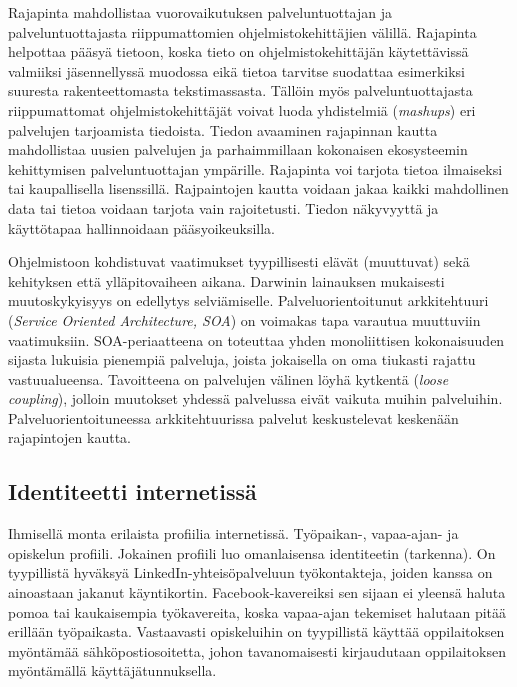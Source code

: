 \documentclass[finnish,gradu]{tktltiki}
\begin{document}
  Rajapinta mahdollistaa vuorovaikutuksen palveluntuottajan ja palveluntuottajasta riippumattomien ohjelmistokehittäjien välillä. Rajapinta helpottaa pääsyä tietoon, koska tieto on ohjelmistokehittäjän käytettävissä valmiiksi jäsennellyssä muodossa eikä tietoa tarvitse suodattaa esimerkiksi suuresta rakenteettomasta tekstimassasta. Tällöin myös palveluntuottajasta riippumattomat ohjelmistokehittäjät voivat luoda yhdistelmiä (\emph{mashups}) eri palvelujen tarjoamista tiedoista. Tiedon avaaminen rajapinnan kautta mahdollistaa uusien palvelujen ja parhaimmillaan kokonaisen ekosysteemin kehittymisen palveluntuottajan ympärille. Rajapinta voi tarjota tietoa ilmaiseksi tai kaupallisella lisenssillä. Rajpaintojen kautta voidaan jakaa kaikki mahdollinen data tai tietoa voidaan tarjota vain rajoitetusti. Tiedon näkyvyyttä ja käyttötapaa hallinnoidaan pääsyoikeuksilla.

  Ohjelmistoon kohdistuvat vaatimukset tyypillisesti elävät (muuttuvat) sekä kehityksen että ylläpitovaiheen aikana. Darwinin lainauksen mukaisesti muutoskykyisyys on edellytys selviämiselle. Palveluorientoitunut arkkitehtuuri (\emph{Service Oriented Architecture, SOA}) on voimakas tapa varautua muuttuviin vaatimuksiin. SOA-periaatteena on toteuttaa yhden monoliittisen kokonaisuuden sijasta lukuisia pienempiä palveluja, joista jokaisella on oma tiukasti rajattu vastuualueensa. Tavoitteena on palvelujen välinen löyhä kytkentä (\emph{loose coupling}), jolloin muutokset yhdessä palvelussa eivät vaikuta muihin palveluihin. Palveluorientoituneessa arkkitehtuurissa palvelut keskustelevat keskenään rajapintojen kautta.


  \subsection{Identiteetti internetissä} %
  \label{sub:identiteetti_internetissä}

  Ihmisellä monta erilaista profiilia internetissä. Työpaikan-, vapaa-ajan- ja opiskelun profiili. Jokainen profiili luo omanlaisensa identiteetin (tarkenna). On tyypillistä hyväksyä LinkedIn-yhteisöpalveluun työkontakteja, joiden kanssa on ainoastaan jakanut käyntikortin. Facebook-kavereiksi sen sijaan ei yleensä haluta pomoa tai kaukaisempia työkavereita, koska vapaa-ajan tekemiset halutaan pitää erillään työpaikasta. Vastaavasti opiskeluihin on tyypillistä käyttää oppilaitoksen myöntämää sähköpostiosoitetta, johon tavanomaisesti kirjaudutaan oppilaitoksen myöntämällä käyttäjätunnuksella.
\end{document}
